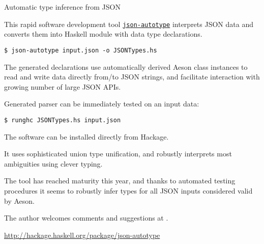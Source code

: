 \begin{hcarentry}[new]{Automatic type inference from JSON}
\label{jsonautotype}
\makeheader

This rapid software development tool \href{https://github.com/mgajda/json-autotype}{\texttt{json-autotype}} interprets JSON
data and converts them into Haskell module with data type declarations.

\begin{verbatim}
$ json-autotype input.json -o JSONTypes.hs
\end{verbatim}

The generated declarations use automatically derived Aeson class instances
to read and write data directly from/to JSON strings,
and facilitate interaction with growing number of large JSON APIs.

Generated parser can be immediately tested on an input data:

\begin{verbatim}
$ runghc JSONTypes.hs input.json
\end{verbatim}

The software can be installed directly from Hackage.

It uses sophisticated union type unification, and robustly
interprets most ambiguities using clever typing.

The tool has reached maturity this year, and thanks to automated testing procedures it seems to robustly infer types
for all JSON inputs considered valid by Aeson.

The author welcomes comments and suggestions at .

\FurtherReading
\url{http://hackage.haskell.org/package/json-autotype}
\end{hcarentry}

